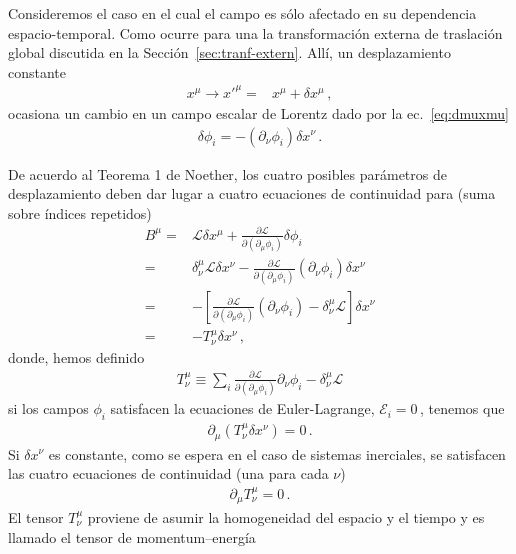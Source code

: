 \begin{frame}
  Consideremos el caso en el cual el campo es sólo afectado en su dependencia espacio-temporal. Como ocurre para una la transformación externa de traslación global
  discutida en la Sección~\ref{sec:tranf-extern}. Allí, un desplazamiento constante
\begin{align}
  x^\mu\to{x'}^\mu=&x^\mu+\delta x^{\mu}\,,
\end{align}
ocasiona un cambio en
  un campo escalar de Lorentz dado por la ec.~\eqref{eq:dmuxmu}
  \begin{align}
    \delta\phi_{i}=-\left( \partial_{\nu}\phi_i \right)\delta x^{\nu}\,.
  \end{align}

  De acuerdo al Teorema 1 de Noether, los cuatro posibles parámetros de desplazamiento deben dar lugar a cuatro ecuaciones de continuidad para (suma sobre índices repetidos)
\begin{align}
     B^{\mu}=& \mathcal{L} \delta x^{\mu} + \frac{\partial\mathcal{L}}{\partial(\partial_{\mu}\phi_i)}\delta\phi_{i} \nonumber\\
  =&\delta_{\nu}^{\mu} \mathcal{L} \delta x^{\nu} - \frac{\partial\mathcal{L}}{\partial(\partial_{\mu}\phi_i)} \left( \partial_{\nu}\phi_i \right)\delta x^{\nu}   \nonumber\\
  =&- \left[\frac{\partial\mathcal{L}}{\partial(\partial_{\mu}\phi_i)} \left( \partial_{\nu}\phi_i \right) - \delta_{\nu}^{\mu} \mathcal{L} \right] \delta x^{\nu}   \nonumber\\
  =&    - T^{\mu}_{\nu} \delta x^{\nu}\,,
\end{align}
donde, hemos definido
\begin{align}
  T^{\mu}_{\nu}\equiv\sum_i \frac{\partial\mathcal{L}}{\partial(\partial_{\mu}\phi_i)}\partial_{\nu}\phi_i-\delta^{\mu}_{\nu}\mathcal{L}
\end{align}
si los campos $\phi_{i}$ satisfacen la ecuaciones de Euler-Lagrange, $\mathcal{E}_i=0\,$, tenemos que
\begin{align}
  \partial_{\mu} \left( T^{\mu}_{\nu} \delta x^{\nu}\right)=0\,.
\end{align}
Si $\delta x^{\nu}$ es constante, como se espera en el caso de sistemas inerciales, se satisfacen las cuatro  ecuaciones de continuidad (una para cada $\nu$)
\begin{align}
  \partial_{\mu} T^{\mu}_{\nu}=0\,.
\end{align}
El tensor $T^\mu_\nu$ proviene de asumir la homogeneidad del espacio y el tiempo y es llamado el tensor de momentum--energía \cite{1605.01121}
\end{frame}

